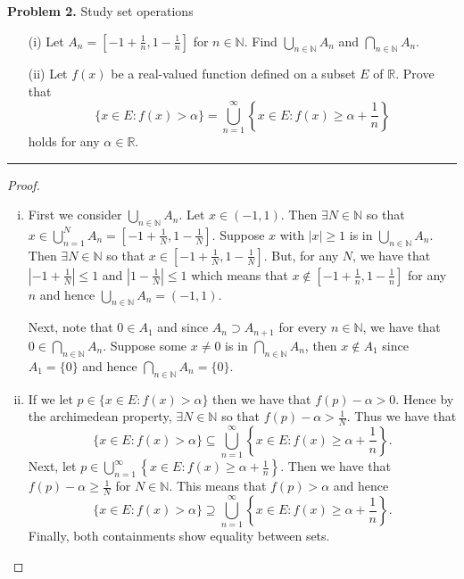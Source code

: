 \documentclass[leqno]{article}
\theoremstyle{nonumberplain}
\newtheorem{proof}{Proof}
\newcommand{\N}{\mathbb{N}}
\begin{document}
\noindent\textbf{Problem 2.} \quad
Study set operations
\begin{itemize}
\item [(i)]
  Let $ \displaystyle A_n = \left[ -1+\frac{1}{n}, 1-\frac{1}{n} \right] $
  for $ n \in \mathbb{N} $.
  Find $ \displaystyle \bigcup_{n \in \mathbb{N}} A_n $
  and $ \displaystyle \bigcap_{n \in \mathbb{N}} A_n $.
\item [(ii)]
  Let $ f(x) $ be a real-valued function
  defined on a subset $ E $ of $ \mathbb{R} $.
  Prove that
  $$
    \displaystyle
    \{ x \in E: f(x)>\alpha \}
    = \bigcup_{n=1}^\infty \left\{ x \in E: f(x) \ge \alpha + \frac{1}{n} \right\}
  $$
  holds for any $ \alpha \in \mathbb{R} $.
\end{itemize}

\noindent\rule[0.5ex]{\linewidth}{1pt}


\begin{proof}~
\begin{enumerate}[(i)]
\item First we consider $\bigcup_{n\in \N} A_n$.  Let $x\in (-1,1)$.  Then $\exists N \in \N$ so that $x\in \bigcup_{n=1}^N A_n = \left[-1+\frac{1}{N},1-\frac{1}{N}\right]$. Suppose $x$ with $|x|\geq 1$ is in $\bigcup_{n\in \N} A_n$.  Then $\exists N \in \N$ so that $x \in \left[-1+\frac{1}{N},1-\frac{1}{N}\right]$. But, for any $N$, we have that $\left| -1+\frac{1}{N}\right|\leq 1$ and $\left| 1-\frac{1}{N}\right| \leq 1$ which means that $x \notin \left[ -1 +\frac{1}{n},1-\frac{1}{n}\right]$ for any $n$ and hence $\bigcup_{n\in \N} A_n = (-1,1)$.

Next, note that $0\in A_1$ and since $A_n \supset A_{n+1}$ for every $n\in \N$, we have that $0 \in \bigcap_{n\in \N} A_n$.  Suppose some $x\neq 0$ is in $\bigcap_{n\in \N} A_n$, then $x\notin A_1$ since $A_1 = \{0\}$ and hence $\bigcap_{n\in \N} A_n = \{0\}$.

\item If we let $p\in \{x\in E \colon f(x)>\alpha\}$ then we have that $f(p)-\alpha>0$.  Hence by the archimedean property, $\exists N \in \N$ so that $f(p)-\alpha> \frac{1}{N}$.  Thus we have that 
\[
\{x\in E \colon f(x)> \alpha \} \subseteq \bigcup_{n=1}^\infty \left\{ x \in E \colon f(x)\geq \alpha +\frac{1}{n} \right\}.
\]
Next, let $p\in \bigcup_{n=1}^\infty \left\{ x \in E \colon f(x)\geq \alpha +\frac{1}{n} \right\}$.  Then we have that $f(p)-\alpha \geq \frac{1}{N}$ for $N\in \N$.  This means that $f(p)>\alpha$ and hence
\[
\{x\in E \colon f(x)> \alpha \} \supseteq \bigcup_{n=1}^\infty \left\{ x \in E \colon f(x)\geq \alpha +\frac{1}{n} \right\}.
\]
Finally, both containments show equality between sets.
\end{enumerate}
\end{proof}
\end{document}
